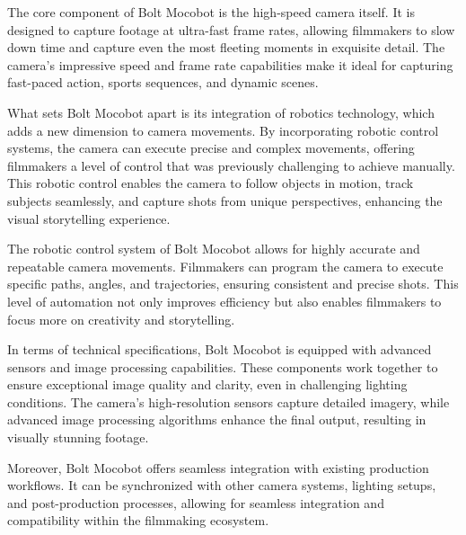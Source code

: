 \documentclass[a4paper,11pt]{report}
\begin{document}
The core component of Bolt Mocobot is the high-speed camera itself. It is designed to capture footage at ultra-fast frame rates, allowing filmmakers to slow down time and capture even the most fleeting moments in exquisite detail. The camera's impressive speed and frame rate capabilities make it ideal for capturing fast-paced action, sports sequences, and dynamic scenes.

What sets Bolt Mocobot apart is its integration of robotics technology, which adds a new dimension to camera movements. By incorporating robotic control systems, the camera can execute precise and complex movements, offering filmmakers a level of control that was previously challenging to achieve manually. This robotic control enables the camera to follow objects in motion, track subjects seamlessly, and capture shots from unique perspectives, enhancing the visual storytelling experience.

The robotic control system of Bolt Mocobot allows for highly accurate and repeatable camera movements. Filmmakers can program the camera to execute specific paths, angles, and trajectories, ensuring consistent and precise shots. This level of automation not only improves efficiency but also enables filmmakers to focus more on creativity and storytelling.

In terms of technical specifications, Bolt Mocobot is equipped with advanced sensors and image processing capabilities. These components work together to ensure exceptional image quality and clarity, even in challenging lighting conditions. The camera's high-resolution sensors capture detailed imagery, while advanced image processing algorithms enhance the final output, resulting in visually stunning footage.

Moreover, Bolt Mocobot offers seamless integration with existing production workflows. It can be synchronized with other camera systems, lighting setups, and post-production processes, allowing for seamless integration and compatibility within the filmmaking ecosystem.
\end{document}

